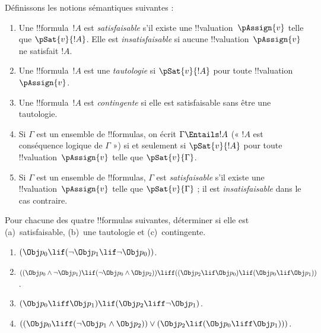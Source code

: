 \documentclass[../../../include/open-logic-section]{subfiles}
\begin{document}


Définissons les notions sémantiques suivantes :

\begin{defn}
\begin{enumerate}
\item Une !!{formula}~$!A$ est \emph{satisfaisable} s'il existe une
  !!{valuation}~$\pAssign{v}$ telle que $\pSat{v}{!A}$.
  Elle est \emph{insatisfaisable} si aucune !!{valuation}~$\pAssign{v}$
  ne satisfait $!A$.
\item Une !!{formula}~$!A$ est une \emph{tautologie} si
  $\pSat{v}{!A}$ pour toute !!{valuation}~$\pAssign{v}$.
\item Une !!{formula}~$!A$ est \emph{contingente} si elle est
  satisfaisable sans être une tautologie.
\item Si $\Gamma$ est un ensemble de !!{formula}s, on écrit
  $\Gamma \Entails !A$ (« $!A$ est conséquence logique de $\Gamma$ »)
  si et seulement si $\pSat{v}{!A}$ pour toute
  !!{valuation}~$\pAssign{v}$ telle que $\pSat{v}{\Gamma}$.
\item Si $\Gamma$ est un ensemble de !!{formula}s, $\Gamma$ est
  \emph{satisfaisable} s'il existe une !!{valuation}~$\pAssign{v}$
  telle que $\pSat{v}{\Gamma}$ ; il est \emph{insatisfaisable}
  dans le cas contraire.
\end{enumerate}
\end{defn}

\begin{prob}
\begin{samepage}Pour chacune des quatre !!{formula}s suivantes, déterminer si elle est
(a)~satisfaisable, (b)~une tautologie et (c)~contingente.
\begin{enumerate}
  \item \((\Obj p_0 \lif (\lnot \Obj p_1 \lif \lnot \Obj p_0))\).
  \item \(((\Obj p_0 \land \lnot \Obj p_1) \lif (\lnot \Obj p_0 \land \Obj p_2)) \liff ((\Obj p_2 \lif \Obj p_0) \lif (\Obj p_0 \lif \Obj p_1))\).
  \item \((\Obj p_0 \liff \Obj p_1) \lif (\Obj p_2 \liff \lnot \Obj p_1)\).
  \item \(((\Obj p_0 \liff (\lnot \Obj p_1 \land \Obj p_2)) \lor (\Obj p_2 \lif (\Obj p_0 \liff \Obj p_1)))\).
\end{enumerate}\end{samepage}
\end{prob}
\end{document}
